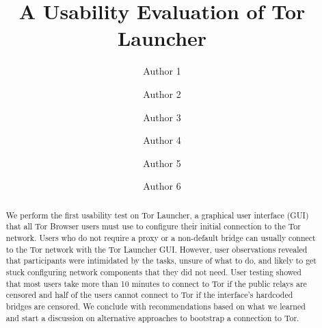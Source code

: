 \documentclass[USenglish,oneside,twocolumn]{article}
\begin{document}
   \author*[1]{Author 1}

  \author[2]{Author 2}

  \author[3]{Author 3}

  \author[4]{Author 4}

  \author[5]{Author 5}
  
  \author[6]{Author 6}

%
%
%
%
%  
%
%
%
%
%  
%   

  \title{\huge A Usability Evaluation of Tor Launcher}



  \begin{abstract}
{
We perform the first usability test on Tor Launcher, a graphical user interface (GUI) that all Tor Browser users must use to configure their initial connection to the Tor network. Users who do not require a proxy or a non-default bridge can usually connect to the Tor network with the Tor Launcher GUI. However, user observations revealed that participants were intimidated by the tasks, unsure of what to do, and likely to get stuck configuring network components that they did not need. User testing showed that most users take more than 10 minutes to connect to Tor if the public relays are censored and half of the users cannot connect to Tor if the interface's hardcoded bridges are censored. We conclude with recommendations based on what we learned and start a discussion on alternative 
approaches to bootstrap a connection to Tor. 
}
\end{abstract}
\end{document}
